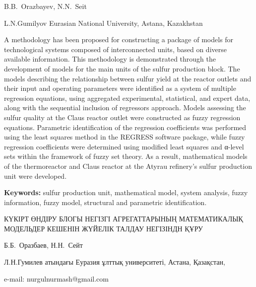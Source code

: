 
\begin{header}

B.B.~Orazbayev,
N.N.~Seit\envelope
\end{header}

\begin{affil}
L.N.Gumilyov Eurasian National University, Astana, Kazakhstan

\end{affil}

A methodology has been proposed for constructing a package of models for
technological systems composed of interconnected units, based on diverse
available information. This methodology is demonst\-rated through the
development of models for the main units of the sulfur production block.
The models describing the relationship between sulfur yield at the
reactor outlets and their input and operating param\-eters were identified
as a system of multiple regression equations, using aggregated
experimental, statisti\-cal, and expert data, along with the sequential
inclusion of regressors approach. Models assessing the sulfur quality at
the Claus reactor outlet were constructed as fuzzy regression equations.
Parametric identification of the regression coefficients was performed
using the least squares method in the REGRESS software package, while
fuzzy regression coefficients were determined using modified least
squares and α-level sets within the framework of fuzzy set theory. As a
result, mathematical models of the thermoreactor and Claus reactor at
the Atyrau refinery's sulfur production unit were developed.

{\bfseries Keywords:} sulfur production unit, mathematical model, system
analysis, fuzzy information, fuzzy model, structural and parametric
identification.

\begin{header}
КҮКІРТ ӨНДІРУ БЛОГЫ НЕГІЗГІ АГРЕГАТТАРЫНЫҢ МАТЕМАТИКАЛЫҚ МОДЕЛЬДЕР КЕШЕНІН ЖҮЙЕЛІК ТАЛДАУ НЕГІЗІНДН ҚҰРУ

Б.Б.~Оразбаев,
Н.Н.~Сейт\envelope
\end{header}

\begin{affil}
Л.Н.Гумилев атындағы Еуразия ұлттық университеті, Астана, Қазақстан,

e-mail: nurgulnurmash@gmail.com
\end{affil}

